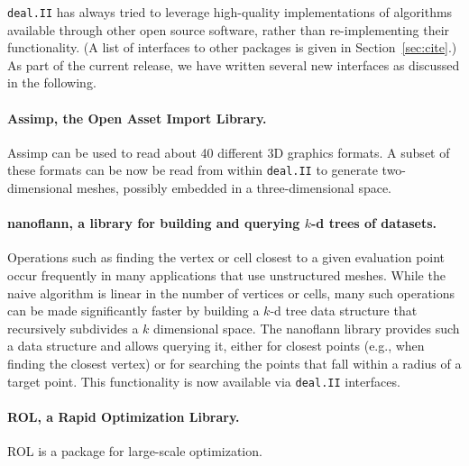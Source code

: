 \documentclass{ansarticle-preprint}
\newcommand{\specialword}[1]{\texttt{#1}}
\newcommand{\dealii}{{\specialword{deal.II}}\xspace}
\begin{document}
\dealii has always tried to leverage high-quality implementations of
algorithms available through other open source software, rather than
re-implementing their functionality. (A list of interfaces to other
packages is given in Section~\ref{sec:cite}.) As part of the current
release, we have written several new interfaces as discussed in the following.

\paragraph*{Assimp, the Open Asset Import Library.}
  Assimp \cite{assimp} can be used to read about 40 different 3D
  graphics formats. A subset of these formats can be now be read from
  within \dealii to generate two-dimensional meshes, possibly embedded in
  a three-dimensional space.


\paragraph*{nanoflann, a library for building and querying
  $k$-d trees of datasets.} Operations such as finding the vertex or cell
  closest to a given evaluation point occur frequently in many applications
  that use unstructured meshes. While the naive algorithm is linear in the
  number of vertices or cells, many such operations can be made significantly
  faster by building a $k$-d tree data structure that recursively subdivides
  a $k$ dimensional space. The nanoflann library \cite{nanoflann} provides
  such a data structure and allows querying it, either for closest points
  (e.g., when finding the closest vertex) or for searching the points that
  fall within a radius of a target point. This functionality is now available
  via \dealii interfaces.

\paragraph*{ROL, a Rapid Optimization Library.}
  ROL \cite{ridzal2014rapid} is a package for large-scale optimization.
\end{document}
